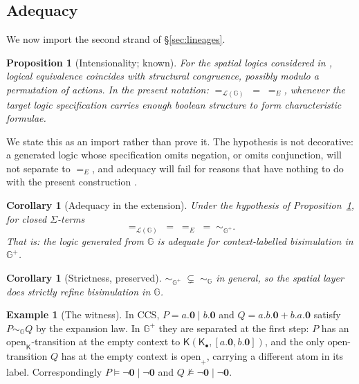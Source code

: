\documentclass[11pt]{article}
\theoremstyle{plain}
\newtheorem{proposition}[theorem]{Proposition}
\newtheorem{corollary}[theorem]{Corollary}
\theoremstyle{definition}
\newtheorem{example}[theorem]{Example}
\newcommand{\Kc}{\mathsf{K}}
\newcommand{\Gg}{\mathbb{G}}
\newcommand{\Lo}{\mathcal{L}}
\newcommand{\op}{\mathrm{open}}
\newcommand{\bis}{\sim}
\begin{document}
\subsection{Adequacy}

We now import the second strand of \S\ref{sec:lineages}.

\begin{proposition}[Intensionality; known]
\label{prop:known}
For the spatial logics considered in \cite{SangiorgiExtInt,HLS02,HLS03,CairesLozes}, logical
equivalence coincides with structural congruence, possibly modulo a permutation of actions. In the
present notation: $=_{\Lo(\Gg)}\; = \;=_E$, whenever the target logic specification carries enough
boolean structure to form characteristic formulae.
\end{proposition}

We state this as an import rather than prove it. The hypothesis is not decorative: a generated logic
whose specification omits negation, or omits conjunction, will not separate to $=_E$, and adequacy
will fail for reasons that have nothing to do with the present construction \cite{Omnibus}.

\begin{corollary}[Adequacy in the extension]
\label{cor:adequacy}
Under the hypothesis of Proposition~\ref{prop:known}, for closed $\Sigma$-terms
\[
=_{\Lo(\Gg)} \;=\; =_E \;=\; \bis_{\Gg^+} .
\]
That is: the logic generated from $\Gg$ is adequate for context-labelled bisimulation in $\Gg^+$.
\end{corollary}

\begin{corollary}[Strictness, preserved]
\label{cor:strict}
$\bis_{\Gg^+} \;\subsetneq\; \bis_{\Gg}$ in general, so the spatial layer does strictly refine
bisimulation in $\Gg$.
\end{corollary}

\begin{example}[The witness]
\label{ex:ccs}
In CCS, $P = a.\mathbf{0} \mid b.\mathbf{0}$ and $Q = a.b.\mathbf{0} + b.a.\mathbf{0}$ satisfy
$P \bis_\Gg Q$ by the expansion law. In $\Gg^+$ they are separated at the first step: $P$ has an
$\op_\Kc$-transition at the empty context to $\Kc(\Kc_\bullet, [a.\mathbf{0}, b.\mathbf{0}])$, and the
only $\op$-transition $Q$ has at the empty context is $\op_+$, carrying a different atom in its label.
Correspondingly $P \models \neg\mathbf{0} \mid \neg\mathbf{0}$ and $Q \not\models
\neg\mathbf{0} \mid \neg\mathbf{0}$.
\end{example}
\end{document}
